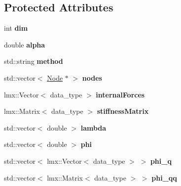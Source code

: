 \subsection*{Protected Attributes}
\begin{CompactItemize}
\item 
\hypertarget{classmknix_1_1Constraint_5fa3727603b390206e6431141b892517}{
int \textbf{dim}}
\label{classmknix_1_1Constraint_5fa3727603b390206e6431141b892517}

\item 
\hypertarget{classmknix_1_1Constraint_b76845f20e7a29693b9161e09074d55a}{
double \textbf{alpha}}
\label{classmknix_1_1Constraint_b76845f20e7a29693b9161e09074d55a}

\item 
\hypertarget{classmknix_1_1Constraint_b05c0dcc5cc535f4e3bed2fd34ed6d75}{
std::string \textbf{method}}
\label{classmknix_1_1Constraint_b05c0dcc5cc535f4e3bed2fd34ed6d75}

\item 
\hypertarget{classmknix_1_1Constraint_a4aa16e121963acf4c086f63137d4ac1}{
std::vector$<$ \hyperlink{classmknix_1_1Node}{Node} $\ast$ $>$ \textbf{nodes}}
\label{classmknix_1_1Constraint_a4aa16e121963acf4c086f63137d4ac1}

\item 
\hypertarget{classmknix_1_1Constraint_0b0fbbf149c32ce0a9dd6e0c4dd5851e}{
lmx::Vector$<$ data\_\-type $>$ \textbf{internalForces}}
\label{classmknix_1_1Constraint_0b0fbbf149c32ce0a9dd6e0c4dd5851e}

\item 
\hypertarget{classmknix_1_1Constraint_0d3ae52c353e897c96d4b0bd6beae94d}{
lmx::Matrix$<$ data\_\-type $>$ \textbf{stiffnessMatrix}}
\label{classmknix_1_1Constraint_0d3ae52c353e897c96d4b0bd6beae94d}

\item 
\hypertarget{classmknix_1_1Constraint_eee7c3bdd61194e3df0e958ff237040a}{
std::vector$<$ double $>$ \textbf{lambda}}
\label{classmknix_1_1Constraint_eee7c3bdd61194e3df0e958ff237040a}

\item 
\hypertarget{classmknix_1_1Constraint_10e027fc12cb248a49a1ded049f0a161}{
std::vector$<$ double $>$ \textbf{phi}}
\label{classmknix_1_1Constraint_10e027fc12cb248a49a1ded049f0a161}

\item 
\hypertarget{classmknix_1_1Constraint_667ecb78177b06981c30e23cb194b806}{
std::vector$<$ lmx::Vector$<$ data\_\-type $>$ $>$ \textbf{phi\_\-q}}
\label{classmknix_1_1Constraint_667ecb78177b06981c30e23cb194b806}

\item 
\hypertarget{classmknix_1_1Constraint_bcc6bafd4cb222abb5bb0d1a0576a4bb}{
std::vector$<$ lmx::Matrix$<$ data\_\-type $>$ $>$ \textbf{phi\_\-qq}}
\label{classmknix_1_1Constraint_bcc6bafd4cb222abb5bb0d1a0576a4bb}

\end{CompactItemize}


